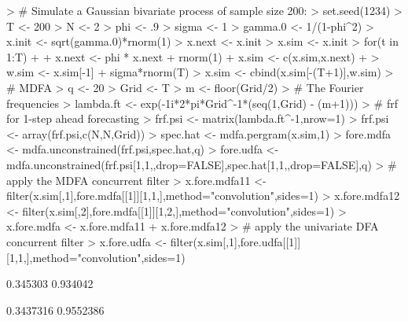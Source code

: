 \documentclass[a4paper]{book}
\begin{document}
\begin{Schunk}
\begin{Sinput}
> # Simulate a Gaussian bivariate process of sample size 200:
> set.seed(1234)
> T <- 200
> N <- 2
> phi <- .9
> sigma <- 1
> gamma.0 <- 1/(1-phi^2)
> x.init <- sqrt(gamma.0)*rnorm(1)
> x.next <- x.init
> x.sim <- x.init
> for(t in 1:T)
+ {
+ 	x.next <- phi * x.next + rnorm(1)
+ 	x.sim <- c(x.sim,x.next)
+ }
> w.sim <- x.sim[-1] + sigma*rnorm(T)
> x.sim <- cbind(x.sim[-(T+1)],w.sim)
> # MDFA
> q <- 20
> Grid <- T
> m <- floor(Grid/2)
> # The Fourier frequencies
> lambda.ft <- exp(-1i*2*pi*Grid^{-1}*(seq(1,Grid) - (m+1)))
> # frf for 1-step ahead forecasting
> frf.psi <- matrix(lambda.ft^{-1},nrow=1) %
> frf.psi <- array(frf.psi,c(N,N,Grid))
> spec.hat <- mdfa.pergram(x.sim,1)	
> fore.mdfa <- mdfa.unconstrained(frf.psi,spec.hat,q)
> fore.udfa <- mdfa.unconstrained(frf.psi[1,1,,drop=FALSE],spec.hat[1,1,,drop=FALSE],q)
> # apply the MDFA concurrent filter
> x.fore.mdfa11 <- filter(x.sim[,1],fore.mdfa[[1]][1,1,],method="convolution",sides=1)
> x.fore.mdfa12 <- filter(x.sim[,2],fore.mdfa[[1]][1,2,],method="convolution",sides=1)
> x.fore.mdfa <- x.fore.mdfa11 + x.fore.mdfa12 
> # apply the univariate DFA concurrent filter
> x.fore.udfa <- filter(x.sim[,1],fore.udfa[[1]][1,1,],method="convolution",sides=1)
\end{Sinput}
\end{Schunk}


\begin{Schunk}
\begin{Soutput}
[1] 0.345303 0.934042
\end{Soutput}
\begin{Soutput}
[1] 0.3437316 0.9552386
\end{Soutput}
\end{Schunk}
\end{document}
